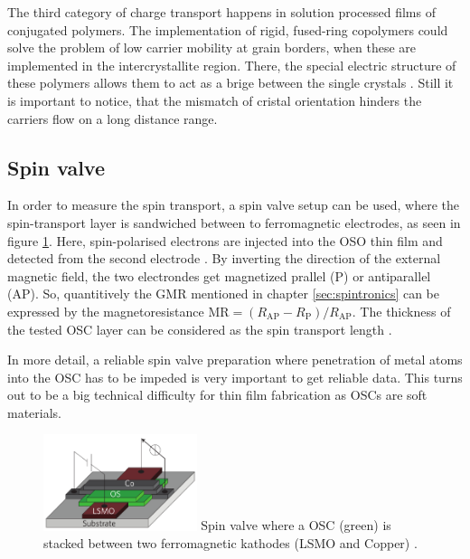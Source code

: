 The third category of charge transport happens in solution processed films of conjugated polymers.
The implementation of rigid, fused-ring copolymers could solve the problem of low carrier mobility at grain borders, when these are implemented in the intercrystallite region.
There, the special electric structure of these polymers allows them to act as a brige between the single crystals \cite{perovskite}.
Still it is important to notice, that the mismatch of cristal orientation hinders the carriers flow on a long distance range.

\subsection{Spin valve}

In order to measure the spin transport, a spin valve setup can be used, where the spin-transport layer is sandwiched between to ferromagnetic electrodes, as seen in figure \ref{fig:valve}.
Here, spin-polarised electrons are injected into the OSO thin film and detected from the second electrode \cite{appl-organic}.
By inverting the direction of the external magnetic field, the two electrondes get magnetized prallel (P) or antiparallel (AP).
So, quantitively the GMR mentioned in chapter \ref{sec:spintronics} can be expressed by the magnetoresistance $\text{MR} = (R_\text{AP}-R_\text{P})/R_\text{AP}$.
The thickness of the tested OSC layer can be considered as the spin transport length \cite{appl-organic}.

In more detail, a reliable spin valve preparation where penetration of metal atoms into the OSC has to be impeded is very important to get reliable data.
This turns out to be a big technical difficulty for thin film fabrication as OSCs are soft materials. 

\begin{figure}
    \centering
  \captionsetup{width=0.7\linewidth}
  \includegraphics[width=0.4\textwidth]{graphics/valve.png}
  {Spin valve where a OSC (green) is stacked between two ferromagnetic kathodes (LSMO and Copper) \cite{routes}.}
  \label{fig:valve}
\end{figure}

